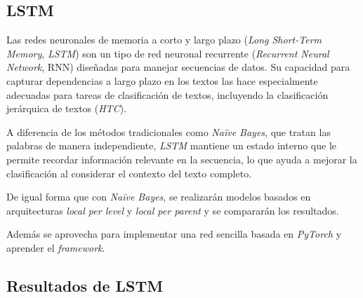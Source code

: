\documentclass[12pt,letterpaper]{article}
\begin{document}
\subsection{LSTM}
Las redes neuronales de memoria a corto y largo plazo (\textit{Long Short-Term Memory}, \textit{LSTM}) son un tipo de red neuronal recurrente (\textit{Recurrent Neural Network}, RNN) diseñadas para manejar secuencias de datos. Su capacidad para capturar dependencias a largo plazo en los textos las hace especialmente adecuadas para tareas de clasificación de textos, incluyendo la clasificación jerárquica de textos (\textit{HTC}).

A diferencia de los métodos tradicionales como \textit{Naïve Bayes}, que tratan las palabras de manera independiente, \textit{LSTM} mantiene un estado interno que le permite recordar información relevante en la secuencia, lo que ayuda a mejorar la clasificación al considerar el contexto del texto completo.

De igual forma que con \textit{Naïve Bayes}, se realizarán modelos basados en arquitecturas \textit{local per level} y \textit{local per parent} y se compararán los resultados.

Además se aprovecha para implementar una red sencilla basada en \textit{PyTorch} y aprender el \textit{framework}.

\subsection{Resultados de LSTM}
\end{document}
